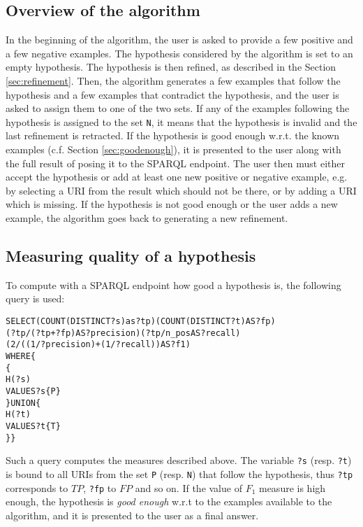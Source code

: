 \documentclass{llncs}
\begin{document}
\subsection{Overview of the algorithm\label{sec:overview}}

In the beginning of the algorithm, the user is asked to provide a few positive and a few negative examples.
The hypothesis considered by the algorithm is set to an empty hypothesis.
The hypothesis is then refined, as described in the Section \ref{sec:refinement}.
Then, the algorithm generates a few examples that follow the hypothesis and a few examples that contradict the hypothesis, and the user is asked to assign them to one of the two sets.
If any of the examples following the hypothesis is assigned to the set \texttt{N}, it means that the hypothesis is invalid and the last refinement is retracted.
If the hypothesis is good enough w.r.t. the known examples (c.f. Section \ref{sec:goodenough}), it is presented to the user along with the full result of posing it to the SPARQL endpoint.
The user then must either accept the hypothesis or add at least one new positive or negative example, e.g. by selecting a URI from the result which should not be there, or by adding a URI which is missing.
If the hypothesis is not good enough or the user adds a new example, the algorithm goes back to generating a new refinement.

\subsection{Measuring quality of a hypothesis \label{sec:goodenough}}

To compute with a SPARQL endpoint how good a hypothesis is, the following query is used:
\begin{alltt}
SELECT (COUNT(DISTINCT ?s) as ?tp) (COUNT(DISTINCT ?t) AS ?fp) 
        (?tp/(?tp+?fp) AS ?precision) (?tp/n_pos AS ?recall)
        (2/((1/?precision)+(1/?recall)) AS ?f1)
WHERE \{
    \{
        H(?s)
        VALUES ?s \{ P \}
    \} UNION \{
        H(?t)
        VALUES ?t \{ T \}
    \}\}
\end{alltt}
Such a query computes the measures described above.
The variable \texttt{?s} (resp. \texttt{?t}) is bound to all URIs from the set \texttt{P} (resp. \texttt{N}) that follow the hypothesis, thus \texttt{?tp} corresponds to $TP$, \texttt{?fp} to $FP$ and so on.
If the value of $F_1$ measure is high enough, the hypothesis is \emph{good enough} w.r.t to the examples available to the algorithm, and it is presented to the user as a final answer.
\end{document}
